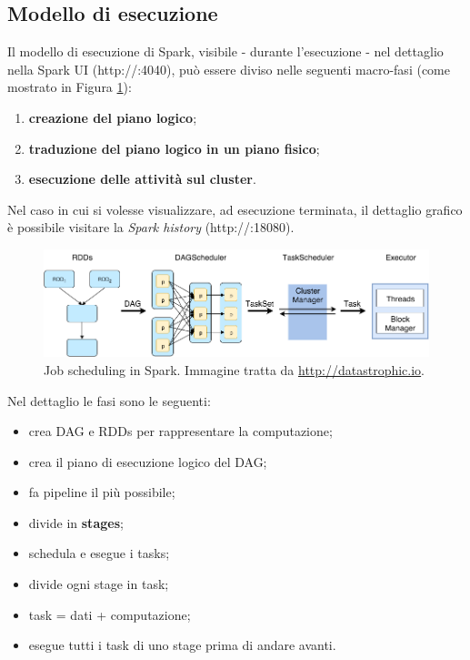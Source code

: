 \documentclass[12pt,italian]{article}
\begin{document}
\subsection{Modello di esecuzione} 
Il modello di esecuzione di Spark, visibile - durante l'esecuzione - nel dettaglio nella Spark UI (http://:4040), può essere diviso nelle seguenti macro-fasi (come mostrato in Figura \ref{fig:model}):
\begin{enumerate}
	\item \textbf{creazione del piano logico};
	\item \textbf{traduzione del piano logico in un piano fisico};
	\item \textbf{esecuzione delle attività sul cluster}.
\end{enumerate}
Nel caso in cui si volesse visualizzare, ad esecuzione terminata, il dettaglio grafico è possibile visitare la \textit{Spark history} (http://:18080).
\begin{figure}[H]
	\centering 
	\includegraphics[width=1\linewidth]{img/model.png}
	\caption{Job scheduling in Spark. Immagine tratta da \url{http://datastrophic.io}.}
	\label{fig:model}
\end{figure}
Nel dettaglio le fasi sono le seguenti:
\begin{itemize}
	\item crea DAG e RDDs per rappresentare la computazione;
	\item crea il piano di esecuzione logico del DAG;
	\item fa pipeline il più possibile;
	\item divide in \textbf{stages};
	\item schedula e esegue i tasks;
	\item divide ogni stage in task;
	\item task = dati + computazione;
	\item esegue tutti i task di uno stage prima di andare avanti.
\end{itemize}
\end{document}
